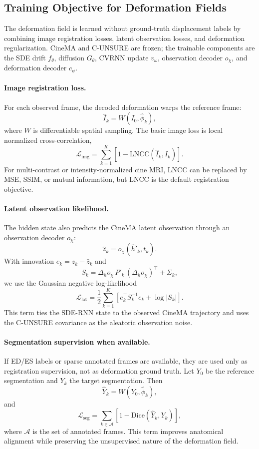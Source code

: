 \subsection{Training Objective for Deformation Fields}
\label{sec:deformation_training_objective}

The deformation field is learned without ground-truth displacement
labels by combining image registration losses, latent observation losses,
and deformation regularization. CineMA and C-UNSURE are frozen; the
trainable components are the SDE drift $f_\theta$, diffusion
$G_\theta$, CVRNN update $v_\omega$, observation decoder $o_\chi$, and
deformation decoder $c_\psi$.

\paragraph{Image registration loss.}
For each observed frame, the decoded deformation warps the reference
frame:
\[
    \widehat I_k = W(I_0,\widehat\phi_k),
\]
where $W$ is differentiable spatial sampling. The basic image loss is
local normalized cross-correlation,
\[
    \mathcal{L}_{\mathrm{img}}
    =
    \sum_{k=1}^{K}
    \left[
    1-\mathrm{LNCC}(\widehat I_k,I_k)
    \right].
\]
For multi-contrast or intensity-normalized cine MRI, $\mathrm{LNCC}$ can
be replaced by MSE, SSIM, or mutual information, but LNCC is the default
registration objective.

\paragraph{Latent observation likelihood.}
The hidden state also predicts the CineMA latent observation through an
observation decoder $o_\chi$:
\[
    \widehat z_k = o_\chi(\hat h'_k,t_k).
\]
With innovation $e_k=z_k-\widehat z_k$ and
\[
    S_k =
    \Delta_h o_\chi\,P'_k\,(\Delta_h o_\chi)^\top+\Sigma_k,
\]
we use the Gaussian negative log-likelihood
\[
    \mathcal{L}_{\mathrm{lat}}
    =
    \frac{1}{2}\sum_{k=1}^{K}
    \left[
    e_k^\top S_k^{-1}e_k + \log|S_k|
    \right].
\]
This term ties the SDE-RNN state to the observed CineMA trajectory and
uses the C-UNSURE covariance as the aleatoric observation noise.

\paragraph{Segmentation supervision when available.}
If ED/ES labels or sparse annotated frames are available, they are used
only as registration supervision, not as deformation ground truth. Let
$Y_0$ be the reference segmentation and $Y_k$ the target segmentation.
Then
\[
    \widehat Y_k = W(Y_0,\widehat\phi_k),
\]
and
\[
    \mathcal{L}_{\mathrm{seg}}
    =
    \sum_{k\in\mathcal{A}}
    \left[
    1-\mathrm{Dice}(\widehat Y_k,Y_k)
    \right],
\]
where $\mathcal{A}$ is the set of annotated frames. This term improves
anatomical alignment while preserving the unsupervised nature of the
deformation field.

